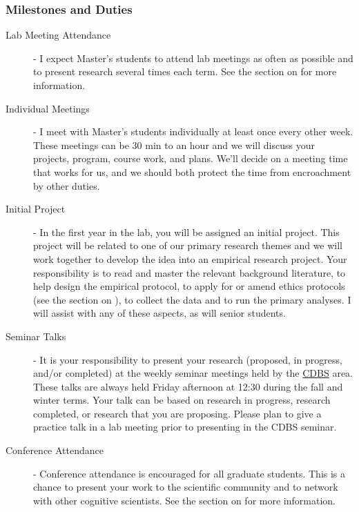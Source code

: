 \documentclass{article}
\begin{document}
\subsubsection{Milestones and Duties}

\begin{description}
\item [Lab Meeting Attendance] - I expect Master's students to attend lab meetings as often as possible and to present research several times each term. See the section on  for more information.

\item [Individual Meetings] - I meet with Master's students individually at least once every other week. These meetings can be 30 min to an hour and we will discuss your projects, program, course work, and plans. We'll decide on a meeting time that works for us, and we should both protect the time from encroachment by other duties. 

\item [Initial Project] - In the first year in the lab, you will be assigned an initial project. This project will be related to one of our primary research themes and we will work together to develop the idea into an empirical research project. Your responsibility is to read and master the relevant background literature, to help design the empirical protocol, to apply for or amend ethics protocols (see the section on ), to collect the data and to run the primary analyses. I will assist with any of these aspects, as will senior students. 

\item [Seminar Talks] - It is your responsibility to present your research (proposed, in progress, and/or completed) at the weekly seminar meetings held by the \href{http://psychology.uwo.ca/graduate/program_information/cdbs_program_requirements.html} {CDBS} area. These talks are always held Friday afternoon at 12:30 during the fall and winter terms. Your talk can be based on research in progress, research completed, or research that you are proposing. Please plan to give a practice talk in a lab meeting prior to presenting in the CDBS seminar. 

\item [Conference Attendance] - Conference attendance is encouraged for all graduate students. This is a chance to present your work to the scientific community and to network with other cognitive scientists. See the section on  for more information.


\end{description}
\end{document}
